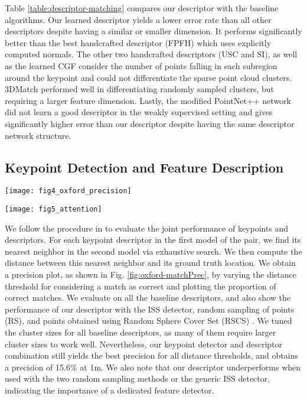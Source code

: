 \documentclass[runningheads]{llncs}
\begin{document}
Table \ref{table:descriptor-matching} compares our descriptor with the baseline algorithms. Our learned descriptor yields a lower error rate than all other descriptors despite having a similar or smaller dimension. It performs significantly better than the best handcrafted descriptor (FPFH) which uses explicitly computed normals. The other two handcrafted descriptors (USC and SI), as well as the learned CGF consider the number of points falling in each subregion around the keypoint and could not differentiate the sparse point cloud clusters.
3DMatch performed well in differentiating randomly sampled clusters, but requiring a larger feature dimension.
Lastly, the modified PointNet++ network did not learn a good descriptor in the weakly supervised setting and gives significantly higher error than our descriptor despite having the same descriptor network structure.

\subsection{Keypoint Detection and Feature Description}

\begin{figure*}[t]
\centering
\texttt{[image: fig4\_oxford\_precision]}
\caption{Precision on the Oxford Robotcar dataset using different keypoint and descriptor combination. (Kpt = keypoints, Desc = descriptors)}
\label{fig:oxford-matchPrec}
\end{figure*}

\begin{figure*}[t]
\centering
\texttt{[image: fig5\_attention]}
\caption{Left: Attention using proposed method (brighter colors indicate higher attention). Middle: Our Keypoints (red dots). Right: ISS keypoints (red dots). Colors in middle and right images indicate different heights above ground.}
\label{fig:attention}
\end{figure*}

We follow the procedure in \cite{CGF} to evaluate the joint performance of keypoints and descriptors. For each keypoint descriptor in the first model of the pair, we find its nearest neighbor in the second model via exhaustive search. We then compute the distance between this nearest neighbor and its ground truth location.
We obtain a precision plot, as shown in Fig. \ref{fig:oxford-matchPrec}, by varying the distance threshold  for considering a match as correct and plotting the proportion of correct matches.
We evaluate on all the baseline descriptors, and also show the performance of our descriptor with the ISS detector, random sampling of points (RS), and points obtained using Random Sphere Cover Set (RSCS) \cite{Elbaz2017CVPR}.
We tuned the cluster sizes for all baseline descriptors, as many of them require larger cluster sizes to work well. Nevertheless, our keypoint detector and descriptor combination still yields the best precision for all distance thresholds, and obtains a precision of 15.6\% at 1m. We also note that our descriptor underperforms when used with the two random sampling methods or the generic ISS detector, indicating the importance of a dedicated feature detector.
\end{document}
